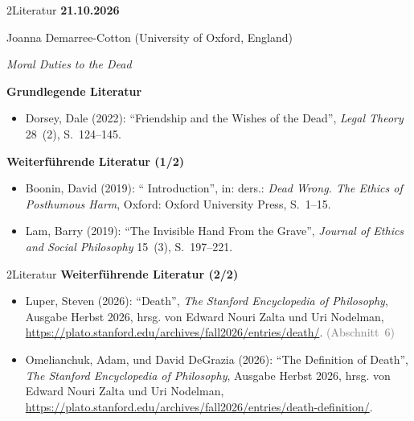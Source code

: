 \documentclass[xcolor=table,9pt,aspectratio=169]{beamer}
\begin{document}
\begin{frame}{\vspace*{10mm}2\hspace*{1em}Literatur}
\textbf{21.10.2026}

\smallskip
Joanna Demarree-Cotton (University of Oxford, England)

\medskip
\textit{Moral Duties to the Dead}


\medskip
\textbf{Grundlegende Literatur}
{\footnotesize
\begin{itemize}[label=,leftmargin=2em,itemindent=-2em]
   \item Dorsey, Dale (2022): \enquote{Friendship and the Wishes of the Dead}, \textit{Legal Theory} 28~(2), S.~124--145.
\end{itemize}
}

\medskip
\textbf{Weiterführende Literatur (1/2)}
{\footnotesize
\begin{itemize}[label=,leftmargin=2em,itemindent=-2em]
   \item Boonin, David (2019): \enquote{ Introduction}, in: ders.: \textit{Dead Wrong. The Ethics of Posthumous Harm}, Oxford: Oxford University Press, S.~1--15.
   \item Lam, Barry (2019): \enquote{The Invisible Hand From the Grave}, \textit{Journal of Ethics and Social Philosophy} 15~(3), S.~197--221.
\end{itemize}
}
\end{frame}


\begin{frame}{\vspace*{10mm}2\hspace*{1em}Literatur}
\textbf{Weiterführende Literatur (2/2)}
{\footnotesize
\begin{itemize}[label=,leftmargin=2em,itemindent=-2em]
   \item Luper, Steven (2026): \enquote{Death}, \textit{The Stanford Encyclopedia of Philosophy}, Ausgabe Herbst 2026, hrsg. von Edward Nouri Zalta und Uri Nodelman, \url{https://plato.stanford.edu/archives/fall2026/entries/death/}. \textcolor{gray}{(Abschnitt~6)}
   \item Omelianchuk, Adam, und David DeGrazia (2026): \enquote{The Definition of Death}, \textit{The Stanford Encyclopedia of Philosophy}, Ausgabe Herbst 2026, hrsg. von Edward Nouri Zalta und Uri Nodelman, \url{https://plato.stanford.edu/archives/fall2026/entries/death-definition/}.
\end{itemize}
}
\end{frame}
\end{document}
